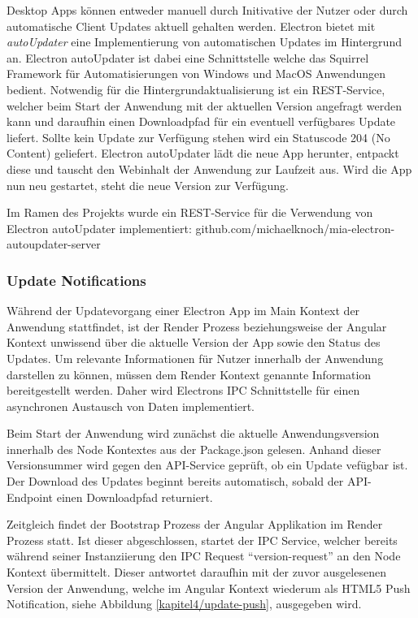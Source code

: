 Desktop Apps können entweder manuell durch Initivative der Nutzer oder durch
automatische Client Updates aktuell gehalten werden.
Electron bietet mit \emph{autoUpdater} eine Implementierung
von automatischen Updates im Hintergrund an.
Electron autoUpdater ist dabei eine Schnittstelle welche das Squirrel Framework
für Automatisierungen von Windows und MacOS Anwendungen bedient.
Notwendig für die Hintergrundaktualisierung ist ein REST-Service, welcher beim Start der Anwendung mit der
aktuellen Version angefragt werden kann
und daraufhin einen Downloadpfad für ein eventuell verfügbares Update liefert.
Sollte kein Update zur Verfügung stehen wird ein Statuscode 204 (No Content) geliefert.
Electron autoUpdater lädt die neue App herunter, entpackt diese und tauscht den Webinhalt der Anwendung zur Laufzeit aus.
Wird die App nun neu gestartet, steht die neue Version zur Verfügung.

Im Ramen des Projekts \projectname{} wurde ein REST-Service für die
Verwendung von Electron autoUpdater implementiert:
github.com/michaelknoch/mia-electron-autoupdater-server

\subsubsection{Update Notifications}

Während der Updatevorgang einer Electron App im Main Kontext der
Anwendung stattfindet, ist der Render Prozess beziehungsweise der Angular Kontext unwissend über die aktuelle
Version der App sowie den Status des Updates. Um relevante Informationen für Nutzer innerhalb der Anwendung darstellen zu können,
müssen dem Render Kontext genannte Information bereitgestellt werden.
Daher wird Electrons IPC Schnittstelle für einen asynchronen Austausch von Daten implementiert.

Beim Start der Anwendung wird zunächst die aktuelle Anwendungsversion innerhalb des Node Kontextes aus der Package.json gelesen.
Anhand dieser Versionsummer wird gegen den API-Service geprüft, ob ein Update vefügbar ist. Der Download des Updates beginnt bereits automatisch,
sobald der API-Endpoint einen Downloadpfad returniert.

Zeitgleich findet der Bootstrap Prozess der Angular Applikation im Render Prozess statt.
Ist dieser abgeschlossen, startet der IPC Service, welcher bereits während seiner Instanziierung den
IPC Request ``version-request'' an den Node Kontext übermittelt.
Dieser antwortet daraufhin mit der zuvor ausgelesenen Version der Anwendung, welche im Angular Kontext wiederum als HTML5 Push Notification, siehe Abbildung \ref{kapitel4/update-push}, ausgegeben wird.

